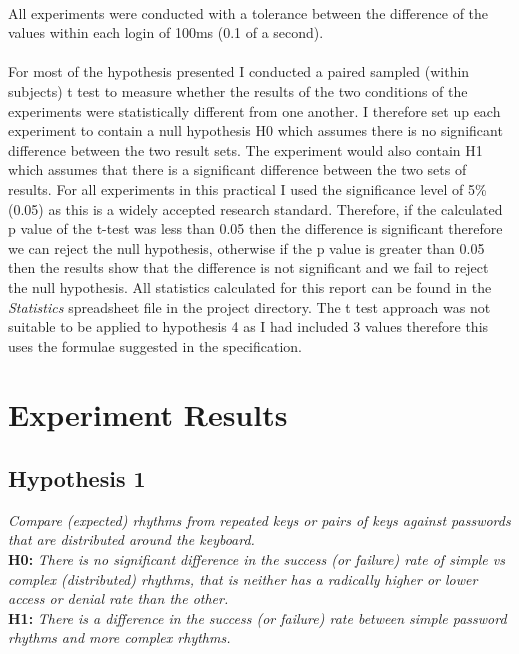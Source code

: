 \documentclass{article}
\begin{document}
\paragraph{}
All experiments were conducted with a tolerance between the difference of the values within each login of 100ms (0.1 of a second). 

\paragraph{}
For most of the hypothesis presented I conducted a paired sampled (within subjects) t test to measure whether the results of the two conditions of the experiments were statistically different from one another. I therefore set up each experiment to contain a null hypothesis H0 which assumes there is no significant difference  between the two result sets. The experiment would also contain H1 which assumes that there is a significant difference between the two sets of results. For all experiments in this practical I used the significance level of 5\% (0.05) as this is a widely accepted research standard. Therefore, if the calculated p value of the t-test was less than 0.05 then the difference is significant therefore we can reject the null hypothesis, otherwise if the p value is greater than 0.05 then the results show that the difference is not significant and we fail to reject the null hypothesis. All statistics calculated for this report can be found in the \textit{Statistics} spreadsheet file in the project directory. The t test approach was not suitable to be applied to hypothesis 4 as I had included 3 values therefore this uses the formulae suggested in the specification.  \\

\section{Experiment Results}

\subsection{Hypothesis 1}
\begin{center}
\textit{Compare	(expected) rhythms	from	repeated	keys	or	pairs	of	keys against	passwords that are	distributed	around	the	keyboard.} \newline \\

\textbf{H0:} \textit{There	is	no significant	difference	in	the	success	(or	failure)	rate	of	simple	vs	complex	(distributed)	rhythms,	that	is	neither has	a	radically	higher	or	lower	access	or	denial	rate	than	the	other.} \newline \\

\textbf{H1:} \textit{There is a difference in the	success	(or	failure)	rate	between	simple password rhythms	and	more complex rhythms.}
\end{center}
\end{document}
